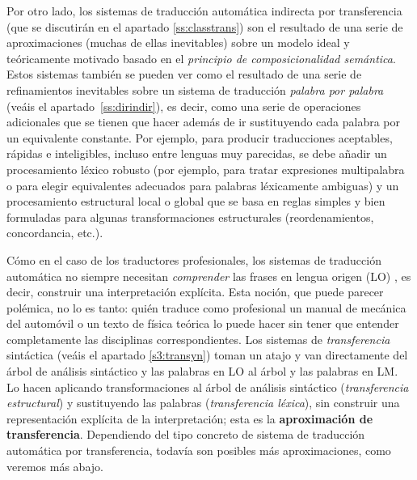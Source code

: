 Por otro lado, los sistemas de traducción automática indirecta por transferencia (que se discutirán en el apartado \ref{ss:classtrans}) son el resultado de una serie de aproximaciones (muchas de ellas inevitables) sobre un modelo ideal y teóricamente motivado basado en el \emph{principio de composicionalidad semántica}. Estos sistemas también se pueden ver como el resultado de una serie de refinamientos inevitables sobre un sistema de traducción \emph{palabra por palabra} (veáis el apartado~\ref{ss:dirindir}), es decir, como una serie de operaciones adicionales que se tienen que hacer además de ir sustituyendo cada palabra por un equivalente constante. Por ejemplo, para producir traducciones aceptables, rápidas e inteligibles, incluso entre lenguas muy parecidas, se debe añadir un procesamiento léxico robusto (por ejemplo, para tratar expresiones multipalabra o para elegir equivalentes adecuados para palabras léxicamente ambiguas) y un procesamiento estructural local o global que se basa en reglas simples y bien formuladas para algunas transformaciones estructurales (reordenamientos, concordancia, etc.). 

Cómo en el caso de los traductores profesionales, los sistemas de traducción automática no siempre necesitan \emph{comprender} las frases en lengua origen (LO) , es decir, construir una interpretación explícita. Esta noción, que puede parecer polémica, no lo es tanto: quién traduce como profesional un manual de mecánica del automóvil o un texto de física teórica lo puede hacer sin tener que entender completamente las disciplinas correspondientes. Los sistemas de \emph{transferencia} sintáctica (veáis el apartado \ref{s3:transyn}) toman un atajo y van directamente del árbol de análisis sintáctico y las palabras en LO al árbol y las palabras en LM. Lo hacen aplicando transformaciones al árbol de análisis sintáctico (\emph{transferencia estructural}) y sustituyendo las palabras (\emph{transferencia léxica}), sin construir una representación explícita de la interpretación; esta es la \textbf{aproximación de transferencia}. Dependiendo del tipo concreto de sistema de traducción automática por transferencia, todavía son posibles más aproximaciones, como veremos más abajo. 

